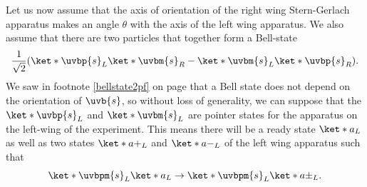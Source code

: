 \documentclass[12pt]{report}
\begin{document}
Let us now assume that the axis of orientation of the right wing Stern-Gerlach apparatus makes an angle $\theta$ with the axis of the left wing apparatus. We also assume that there are two particles that together form a Bell-state \begin{equation}\label{bellstatePI}
	\frac{1}{\sqrt{2}}(\ket*{\uvbp{s}}_L\ket*{\uvbm{s}}_R-\ket*{\uvbm{s}}_L\ket*{\uvbp{s}}_R).
\end{equation}
We saw  in footnote \ref{bellstate2pf} on page \pageref{bellstate2pf} that a Bell state does not depend on the orientation of $\uvb{s}$, so without loss of generality, we can suppose that the $\ket*{\uvbp{s}}_L$ and $\ket*{\uvbm{s}}_L$ %
%
 are pointer states for the apparatus on the left-wing of the experiment. This means there will be a ready state $\ket*{a}_L$  %
  as well as two states $\ket*{a+}_L$ and $\ket*{a-}_L$ %
   of the left wing apparatus such that 
$$\ket*{\uvbpm{s}}_L\ket*{a}_L\rightarrow\ket*{\uvbpm{s}}_L\ket*{a\pm}_L.$$
\end{document}
